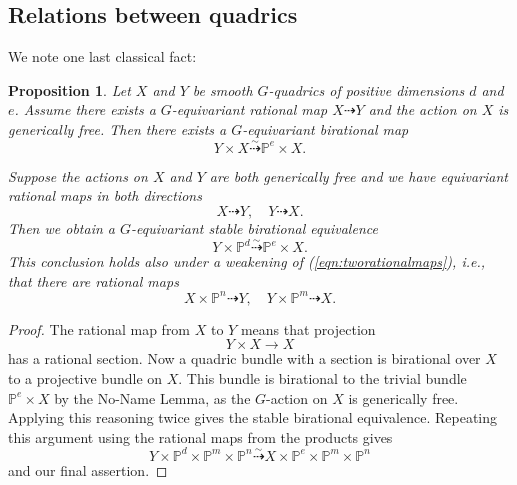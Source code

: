 \documentclass[12pt]{amsart}
\numberwithin{equation}{section}
\newcommand{\ra}{\rightarrow}
\newcommand{\bP}{\mathbb{P}}
\theoremstyle{plain}
\newtheorem{prop}{Proposition}[section]
\theoremstyle{definition}
\theoremstyle{remark}
\begin{document}
\subsection*{Relations between quadrics}
We note one last classical fact:
\begin{prop} \label{prop:getstabrat}
Let $X$ and $Y$ be smooth $G$-quadrics of positive
dimensions $d$ and $e$. Assume there
exists a $G$-equivariant rational map
$ X \dashrightarrow Y$
and the action on $X$ is generically free.
Then there exists a $G$-equivariant birational
map
$$Y \times X \stackrel{\sim}{\dashrightarrow} \bP^e \times X.$$

Suppose the actions on $X$ and $Y$ are both generically
free and we have equivariant rational maps in both directions
\begin{equation} X \dashrightarrow Y, \quad 
Y \dashrightarrow X. \label{eqn:tworationalmaps}
\end{equation}
Then we obtain a $G$-equivariant stable birational equivalence
$$
Y \times \bP^d \stackrel{\sim}{\dashrightarrow} \bP^e \times X.$$
This conclusion holds also under a weakening of (\ref{eqn:tworationalmaps}),
i.e., that there are rational maps
$$X \times \bP^n \dashrightarrow Y, 
\quad Y \times \bP^m \dashrightarrow X.$$
\end{prop}
\begin{proof}
The rational map from $X$ to $Y$ means that projection
$$Y \times X \ra X$$
has a rational section. Now a quadric bundle with a section
is birational over $X$ to a projective bundle on $X$.
This bundle is birational to the trivial bundle 
$\bP^e \times X$ by the No-Name
Lemma, as the $G$-action on $X$ is generically free.
Applying this reasoning twice gives the stable birational
equivalence. Repeating this argument using the rational
maps from the products gives
$$Y\times \bP^d \times \bP^m \times \bP^n \stackrel{\sim}{\dashrightarrow}
X \times \bP^e \times \bP^m \times \bP^n$$
and our final assertion.
\end{proof}
\end{document}
